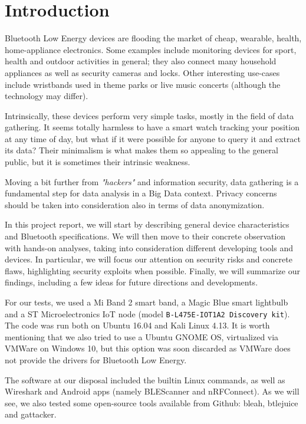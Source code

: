 \chapter{Introduction}
\label{Intro}
\thispagestyle{empty}

\noindent Bluetooth Low Energy devices are flooding the market of cheap, wearable, health, home-appliance electronics. Some examples include monitoring devices for sport, health and outdoor activities in general; they also connect many household appliances as well as security cameras and locks. Other interesting use-cases include wristbands used in theme parks or live music concerts (although the technology may differ).

Intrinsically, these devices perform very simple tasks, mostly in the field of data gathering. It seems totally harmless to have a smart watch tracking your position at any time of day, but what if it were possible for anyone to query it and extract its data? Their minimalism is what makes them so appealing to the general public, but it is sometimes their intrinsic weakness.

Moving a bit further from \textit{"hackers"} and information security, data gathering is a fundamental step for data analysis in a Big Data context. Privacy concerns should be taken into consideration also in terms of data anonymization.

In this project report, we will start by describing general device characteristics and Bluetooth specifications. We will then move to their concrete observation with hands-on analyses, taking into consideration different developing tools and devices. In particular, we will focus our attention on security risks and concrete flaws, highlighting security exploits when possible. Finally, we will summarize our findings, including a few ideas for future directions and developments.

For our tests, we used a Mi Band 2 smart band, a Magic Blue smart lightbulb and a ST Microelectronics IoT node (model \texttt{B-L475E-IOT1A2 Discovery kit}). The code was run both on Ubuntu 16.04 and Kali Linux 4.13. It is worth mentioning that we also tried to use a Ubuntu GNOME OS, virtualized via VMWare on Windows 10, but this option was soon discarded as VMWare does not provide the drivers for Bluetooth Low Energy.

The software at our disposal included the builtin Linux commands, as well as Wireshark and Android apps (namely BLEScanner and nRFConnect). As we will see, we also tested some open-source tools available from Github: bleah, btlejuice and gattacker.